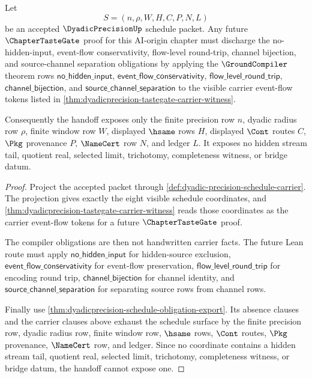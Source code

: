 \begin{theorem}
\label{thm:dyadicprecision-tastegate-compiler-obligation-handoff}
Let
$$
S=(n,\rho,W,H,C,P,N,L)
$$
be an accepted $\DyadicPrecisionUp$ schedule packet. Any future
$\ChapterTasteGate$ proof for this AI-origin chapter must discharge the
no-hidden-input, event-flow conservativity, flow-level round-trip, channel
bijection, and source-channel separation obligations by applying the
$\GroundCompiler$ theorem rows
$\mathsf{no\_hidden\_input}$, $\mathsf{event\_flow\_conservativity}$,
$\mathsf{flow\_level\_round\_trip}$, $\mathsf{channel\_bijection}$, and
$\mathsf{source\_channel\_separation}$ to the visible carrier event-flow tokens
listed in \autoref{thm:dyadicprecision-tastegate-carrier-witness}.

Consequently the handoff exposes only the finite precision row $n$, dyadic
radius row $\rho$, finite window row $W$, displayed $\hsame$ rows $H$,
displayed $\Cont$ routes $C$, $\Pkg$ provenance $P$, $\NameCert$ row $N$, and
ledger $L$. It exposes no hidden stream tail, quotient real, selected limit,
trichotomy, completeness witness, or bridge datum.
\end{theorem}
\begin{proof}
Project the accepted packet through
\autoref{def:dyadic-precision-schedule-carrier}. The projection gives exactly
the eight visible schedule coordinates, and
\autoref{thm:dyadicprecision-tastegate-carrier-witness} reads those coordinates
as the carrier event-flow tokens for a future $\ChapterTasteGate$ proof.

The compiler obligations are then not handwritten carrier facts. The future
Lean route must apply $\mathsf{no\_hidden\_input}$ for hidden-source exclusion,
$\mathsf{event\_flow\_conservativity}$ for event-flow preservation,
$\mathsf{flow\_level\_round\_trip}$ for encoding round trip,
$\mathsf{channel\_bijection}$ for channel identity, and
$\mathsf{source\_channel\_separation}$ for separating source rows from channel
rows.

Finally use \autoref{thm:dyadicprecision-schedule-obligation-export}. Its
absence clauses and the carrier clauses above exhaust the schedule surface by
the finite precision row, dyadic radius row, finite window row, $\hsame$ rows,
$\Cont$ routes, $\Pkg$ provenance, $\NameCert$ row, and ledger. Since no
coordinate contains a hidden stream tail, quotient real, selected limit,
trichotomy, completeness witness, or bridge datum, the handoff cannot expose
one.
\end{proof}

